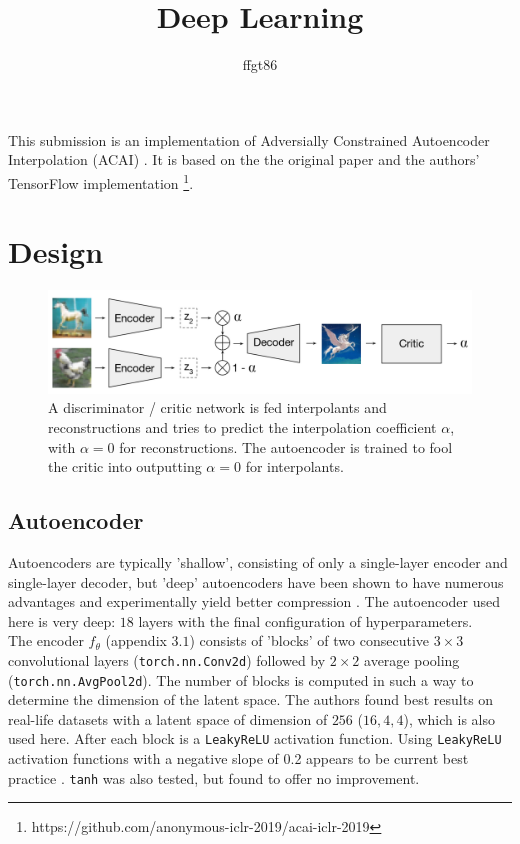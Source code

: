 \documentclass[11pt]{article} %
\title{Deep Learning}
\author{ffgt86}
\begin{document}
\maketitle

This submission is an implementation of Adversially Constrained Autoencoder Interpolation (ACAI) \cite{berthelot_et_al_2019}. It is based on the the original paper \cite{berthelot_et_al_2019} and the authors' TensorFlow implementation \footnote{ https://github.com/anonymous-iclr-2019/acai-iclr-2019}.
\section{Design}

\begin{figure}[h!]
  \includegraphics[width=\linewidth]{structure.png}
  \caption{A discriminator / critic network is fed interpolants and reconstructions and tries to predict the interpolation coefficient $\alpha$, with $\alpha = 0$ for reconstructions. The autoencoder is trained to fool the critic into outputting $\alpha = 0$ for interpolants.}
\end{figure}

\subsection{Autoencoder}

Autoencoders are typically 'shallow', consisting of only a single-layer encoder and single-layer decoder, but 'deep' autoencoders have been shown to have numerous advantages \cite{goodfellow_et_al_2016} and experimentally yield better compression \cite{hinton_salakhutdinov_2006}. The autoencoder used here is very deep: $18$ layers with the final configuration of hyperparameters.\\

The encoder $f_\theta$ (appendix $3.1$) consists of 'blocks' of two consecutive $3 \times 3$ convolutional layers (\verb|torch.nn.Conv2d|) followed by $2 \times 2$ average pooling (\verb|torch.nn.AvgPool2d|). The number of blocks is computed in such a way to determine the dimension of the latent space. The authors found best results on real-life datasets with a latent space of dimension of $256$ ($16, 4, 4$), which is also used here. After each block is a \verb|LeakyReLU| activation function. Using \verb|LeakyReLU| activation functions with a negative slope of 0.2 appears to be current best practice \cite{berthelot_et_al_2019} \cite{heljakka_solin_kannala_2018}. \verb|tanh| was also tested, but found to offer no improvement.\\
\end{document}
